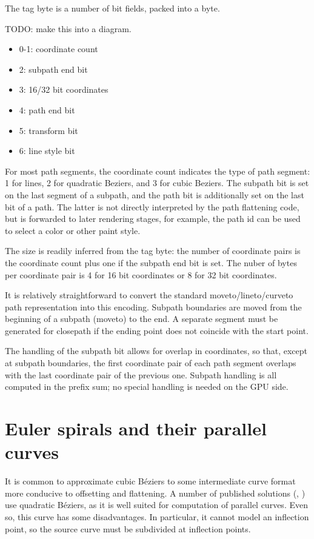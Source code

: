 \documentclass[format=acmsmall]{acmart}
\begin{document}
The tag byte is a number of bit fields, packed into a byte.

TODO: make this into a diagram.

\begin{itemize}
    \item 0-1: coordinate count
    \item 2: subpath end bit
    \item 3: 16/32 bit coordinates
    \item 4: path end bit
    \item 5: transform bit
    \item 6: line style bit
\end{itemize}

For most path segments, the coordinate count indicates the type of path segment: 1 for lines, 2 for quadratic Beziers, and 3 for cubic Beziers. The subpath bit is set on the last segment of a subpath, and the path bit is additionally set on the last bit of a path. The latter is not directly interpreted by the path flattening code, but is forwarded to later rendering stages, for example, the path id can be used to select a color or other paint style.

The size is readily inferred from the tag byte: the number of coordinate pairs is the coordinate count plus one if the subpath end bit is set. The nuber of bytes per coordinate pair is 4 for 16 bit coordinates or 8 for 32 bit coordinates.

It is relatively straightforward to convert the standard moveto/lineto/curveto path representation into this encoding. Subpath boundaries are moved from the beginning of a subpath (moveto) to the end. A separate segment must be generated for closepath if the ending point does not coincide with the start point.

The handling of the subpath bit allows for overlap in coordinates, so that, except at subpath boundaries, the first coordinate pair of each path segment overlaps with the last coordinate pair of the previous one. Subpath handling is all computed in the prefix sum; no special handling is needed on the GPU side.

\section{Euler spirals and their parallel curves}

It is common to approximate cubic Béziers to some intermediate curve format more conducive to offsetting and flattening. A number of published solutions (\cite{Yzerman2020}, \cite{Nehab2020}) use quadratic Béziers, as it is well suited for computation of parallel curves. Even so, this curve has some disadvantages. In particular, it cannot model an inflection point, so the source curve must be subdivided at inflection points.
\end{document}
